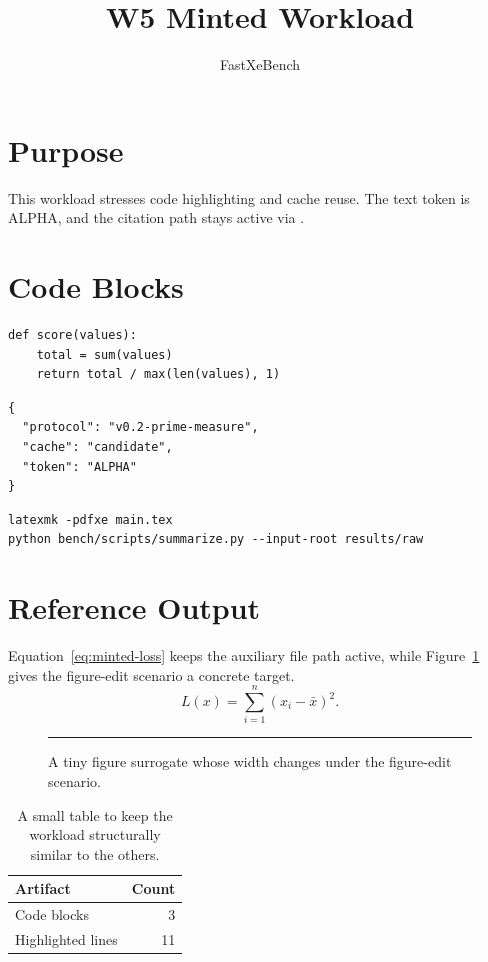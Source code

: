 \documentclass[11pt]{article}
\title{W5 Minted Workload}
\author{FastXeBench}
\date{}
\newcommand{\benchtexttoken}{ALPHA}
\newcommand{\benchfiguretoken}{4.00}
\begin{document}
\maketitle

\section{Purpose}
This workload stresses code highlighting and cache reuse. The text token is \benchtexttoken, and the citation path stays active via \cite{refalpha}.

\section{Code Blocks}
\begin{verbatim}
def score(values):
    total = sum(values)
    return total / max(len(values), 1)
\end{verbatim}

\begin{verbatim}
{
  "protocol": "v0.2-prime-measure",
  "cache": "candidate",
  "token": "ALPHA"
}
\end{verbatim}

\begin{verbatim}
latexmk -pdfxe main.tex
python bench/scripts/summarize.py --input-root results/raw
\end{verbatim}

\section{Reference Output}
Equation~\eqref{eq:minted-loss} keeps the auxiliary file path active, while Figure~\ref{fig:minted-bar} gives the figure-edit scenario a concrete target.
\begin{equation}
\label{eq:minted-loss}
L(x) = \sum_{i=1}^{n} \left(x_i - \bar{x}\right)^2 .
\end{equation}

\begin{figure}[h]
\centering
\rule{\benchfiguretoken cm}{0.6pt}
\caption{A tiny figure surrogate whose width changes under the figure-edit scenario.}
\label{fig:minted-bar}
\end{figure}

\begin{table}[h]
\centering
\begin{tabular}{@{}lr@{}}
\toprule
Artifact & Count \\
\midrule
Code blocks & 3 \\
Highlighted lines & 11 \\
\bottomrule
\end{tabular}
\caption{A small table to keep the workload structurally similar to the others.}
\end{table}



\end{document}
